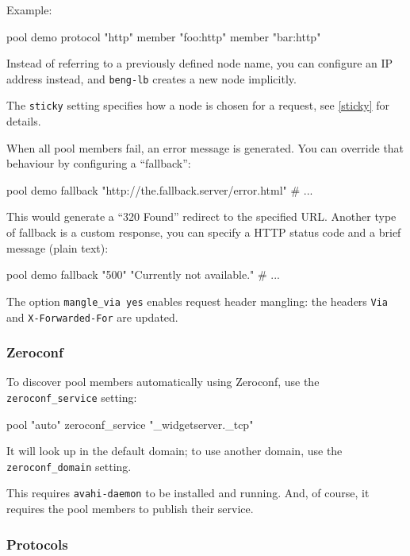 \documentclass[a4paper,12pt]{article}
\begin{document}
Example:

\begin{verbatim*}
pool demo {
  protocol "http"
  member "foo:http"
  member "bar:http"
}
\end{verbatim*}

Instead of referring to a previously defined node name, you can
configure an IP address instead, and \texttt{beng-lb} creates a new
node implicitly.

The \verb|sticky| setting specifies how a node is chosen for a
request, see \ref{sticky} for details.

When all pool members fail, an error message is generated.  You can
override that behaviour by configuring a ``fallback'':

\begin{verbatim*}
pool demo {
  fallback "http://the.fallback.server/error.html"
  # ...
}
\end{verbatim*}

This would generate a ``320 Found'' redirect to the specified URL.
Another type of fallback is a custom response, you can specify a HTTP
status code and a brief message (plain text):

\begin{verbatim*}
pool demo {
  fallback "500" "Currently not available."
  # ...
}
\end{verbatim*}

The option \texttt{mangle\_via yes} enables request header mangling:
the headers \texttt{Via} and \texttt{X-Forwarded-For} are updated.

\subsubsection{Zeroconf}

To discover pool members automatically using Zeroconf, use the
\verb|zeroconf_service| setting:

\begin{verbatim*}
pool "auto" {
   zeroconf_service "_widgetserver._tcp"
}
\end{verbatim*}

It will look up in the default domain; to use another domain, use the
\verb|zeroconf_domain| setting.

This requires \texttt{avahi-daemon} to be installed and running.  And,
of course, it requires the pool members to publish their service.

\subsubsection{Protocols}
\end{document}

